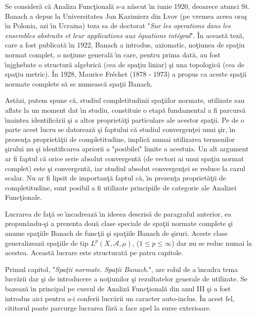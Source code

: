 \documentclass[ a4paper, 12pt]{report}
\theoremstyle{definition}
\theoremstyle{remark}
\numberwithin{equation}{section}
\begin{document}
\indent\indent Se consider\u a c\u a Analiza Func\c tional\u a s-a n\u ascut \^\i n iunie 1920, deoarece atunci St. Banach a depus la Universitatea Jan Kazimierz din Lvov (pe vremea aceea ora\c s \^\i n Polonia, azi \^\i n Ucraina) teza sa de doctorat "\emph{Sur les operations dans les ensembles abstraits et leur applications aux \' equations int\' egral}". \^ In aceast\u a tez\u a, care a fost publicat\u a \^\i n 1922, Banach a introdus, axiomatic, no\c tiunea de spa\c tiu normat complet, o no\c tiune general\u a \^\i n care, pentru prima dat\u a, au fost \^\i njghebate o structur\u a algebric\u a (cea de spa\c tiu liniar) \c si una topologic\u a (cea de spa\c tiu metric). \^ In 1928, Maurice Fr\' echet (1878 - 1973) a propus ca aceste spa\c tii normate complete s\u a se numeasc\u a spa\c tii Banach.

Ast\u azi, putem spune c\u a, studiul completitudinii spa\c tiilor normate, utilizate sau aflate la un moment dat \^\i n studiu, constituie o etap\u a fundamental a fi parcurs\u a \^\i naintea identific\u arii \c si a altor propriet\u a\c ti particulare ale acestor spa\c tii. Pe de o parte acest lucru se datoreaz\u a  \c si faptului c\u a studiul convergen\c tei unui \c sir, \^\i n prezen\c ta propriet\u a\c tii de completitudine, implic\u a numai utilizarea termenilor \c sirului nu \c si identificarea apriorii a "posibilei" limite a acestuia. Un alt argument ar fi faptul c\u a orice serie absolut convergent\u a (de vectori ai unui spa\c tiu normat complet) este \c si convergent\u a, iar studiul absolut convergen\c tei se reduce la cazul scalar. Nu ar fi lipsit de importan\c t\u a faptul c\u a, \^\i n prezen\c ta  propriet\u a\c tii de completitudine, sunt posibil a fi utilizate principiile de categorie ale Analizei Func\c tionale.

Lucrarea de fa\c t\u a se \^\i ncadreaz\u a \^\i n ideeea descris\u a de paragraful anterior, ea propun\^ andu-\c si a prezenta dou\u a clase speciale de spa\c tii normate complete \c si anume spa\c tiile Banach de func\c tii \c si spa\c tiile Banach de \c siruri. Aceste clase generalizeaz\u a  spa\c tiile de tip $L^p(X, \mathcal{A}, \mu)$, ($1 \leq p \leq \infty$) dar nu se reduc numai la acestea. Aceast\u a lucrare este structurat\u a pe patru capitole.

Primul capitol, "\emph{Spa\c tii normate. Spa\c tii Banach.}", are rolul de a \^\i ncadra tema lucr\u arii dar \c si de introducere a no\c tiunilor \c si rezultatelor generale de utilizate. Se bazeaz\u a \^\i n principal pe cursul de Analiz\u a Func\c tional\u a din anul III \c si a fost introdus aici pentru a-i conferii lucr\u arii un caracter auto-inclus. \^ In acest fel, cititorul poate parcurge lucrarea f\u ar\u a a face apel la surse exterioare.
\end{document}
